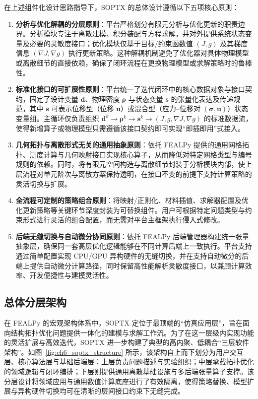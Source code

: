 在上述组件化设计思路指导下，SOPTX 的总体设计遵循以下五项核心原则：
\begin{enumerate}
	\item \textbf{分析与优化解耦的分层原则}：平台严格划分有限元分析与优化更新的职责边界。分析模块专注于离散建模、积分装配与方程求解，并对外提供系统状态变量及必要的灵敏度接口；优化模块仅基于目标/约束函数值 $(J,g)$ 及其梯度信息 $(\nabla J,\nabla g)$ 执行更新策略。这种解耦机制避免了优化器对具体物理模型或离散细节的直接依赖，确保了闭环流程在更换物理模型或求解策略时的鲁棒性。
	
	\item \textbf{标准化接口的可扩展性原则}：平台统一了迭代闭环中的核心数据对象与接口契约，固定了设计变量 $\boldsymbol{d}$、物理密度 $\boldsymbol{\rho}$ 与状态变量 $\boldsymbol{s}$ 的张量化表达及传递规范，其中 $\boldsymbol{s}$ 可表示位移型（位移 $\boldsymbol{u}$）或混合型（应力--位移对 $(\boldsymbol{\sigma}, \boldsymbol{u})$）状态变量组。主循环仅负责组织 $\boldsymbol{d}^k \to \boldsymbol{\rho}^k \to \boldsymbol{s}^k \to (J, g, \nabla J, \nabla g)$ 的标准数据流，使得新增算子或物理模型只需遵循该接口契约即可实现“即插即用”式接入。
	
	\item \textbf{几何拓扑与离散形式无关的通用抽象原则}：依托 FEALPy 提供的通用网格拓扑、测度计算与几何映射接口实现核心算子，从而降低对特定网格类型与编号规则的依赖。同时，将有限元空间构造与离散细节封装于分析模块内部，使上层流程对单元阶次与离散方案保持透明，在接口不变的前提下支持计算策略的灵活切换与扩展。
	
	\item \textbf{全流程可定制的策略组合原则}：将映射/正则化、材料插值、求解器配置及优化更新策略等关键环节深度封装为可替换组件。用户可根据特定问题类型与约束形式进行灵活的组合配置，而无需对平台主框架执行侵入式修改。
	
	\item \textbf{后端无缝切换与自动微分协同原则}：依托 FEALPy 后端管理器构建统一张量抽象层，确保同一套高层优化逻辑能够在不同计算后端上一致执行。平台支持通过简单配置实现 CPU/GPU 异构硬件的无缝切换，并在支持自动微分的后端上提供自动微分计算路径，同时保留高性能解析灵敏度接口，以兼顾计算效率、开发便捷性与建模灵活性。
\end{enumerate}

\subsection{总体分层架构}
\label{sec:soptx_arch_layers}

在 FEALPy 的宏观架构体系中，SOPTX 定位于最顶端的“仿真应用层”，旨在面向结构拓扑优化问题提供一体化的建模与求解工作流。为了在这一层级内实现功能的灵活扩展与高效迭代，SOPTX 进一步构建了典型的高内聚、低耦合“三层软件架构”。如图~\ref{fig:ch6_soptx_structure} 所示，该架构自上而下划分为用户交互层、核心算法层与基础后端层：上层负责问题描述与实验组织；中层承载拓扑优化的领域逻辑与闭环编排；下层则提供通用离散基础设施与多后端张量算子支撑。该分层设计将领域应用与通用数值计算底座进行了有效隔离，使得策略替换、模型扩展与异构硬件切换均可在清晰的层间接口约束下无缝完成。

